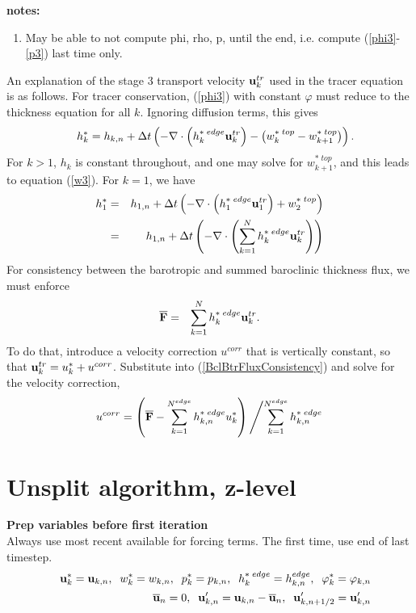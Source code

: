 \documentclass[11pt]{report}
\begin{document}
\newpage
{\bf notes:}
\begin{enumerate}
\item May be able to not compute phi, rho, p, until the end, i.e. compute (\ref{phi3}-\ref{p3}) last time only.
\end{enumerate}

An explanation of the stage 3 transport velocity ${\bf u}_k^{tr}$ used in the tracer equation is as follows.  For tracer conservation, (\ref{phi3}) with constant $\varphi$ must reduce to the thickness equation for all $k$.  Ignoring diffusion terms, this gives
\begin{eqnarray}   &&
\label{phi4}
h_k^* = 
h_{k,n} 
+ \Delta t
\left(  - \nabla \cdot \left( h_k^{*\; edge} {\bf u}_k^{tr} \right)  
- \left( w_k^{*\; top} -  w_{k+1}^{*\; top} \right)  
\right).
\end{eqnarray}
For $k>1$, $h_k$ is constant throughout, and one may solve for $w_{k+1}^{*\; top}$, and this leads to equation (\ref{w3}).  For $k=1$, we have
\begin{eqnarray}  
\label{phi5}
h_1^* &=& 
h_{1,n} 
+ \Delta t
\left(  - \nabla \cdot \left( h_1^{*\; edge} {\bf u}_1^{tr} \right)  
+  w_{2}^{*\; top} 
\right) \\ \label{h6}
&=& h_{1,n} + \Delta t
\left(  - \nabla \cdot \left( \sum_{k=1}^N h_k^{*\; edge} {\bf u}_k^{tr} \right)  
\right)
\end{eqnarray}
For consistency between the barotropic and summed baroclinic thickness flux, we must enforce
\begin{eqnarray}
{\overline {\bf F}} &=& \sum_{k=1}^N h_k^{*\; edge} {\bf u}_k^{tr}.
\label{BclBtrFluxConsistency}
\end{eqnarray}
To do that, introduce a velocity correction $u^{corr}$ that is vertically constant, so that 
${\bf u}_k^{tr}=u^*_k + u^{corr}$.  Substitute into (\ref{BclBtrFluxConsistency}) and solve for the velocity correction,
\begin{eqnarray}
u^{corr} = \left( {\overline {\bf F}} 
  - \sum_{k=1}^{N^{edge}} h_{k,n}^{*\;edge} u_k^* \right)
\left/ \sum_{k=1}^{N^{edge}} h_{k,n}^{*\;edge} \right. 
\end{eqnarray}

\newpage
\section{Unsplit algorithm, z-level}
{\bf Prep variables before first iteration}\\
Always use most recent available for forcing terms.  The first time, use end of last timestep.
\begin{eqnarray} &&
{\bf u}_k^*={\bf u}_{k,n},\;\;
w_k^*=w_{k,n},\;\;
p_k^*=p_{k,n}, \;\;
h_k^{*\; edge}=h_{k,n}^{edge}, \;\;
{\varphi}_k^* = {\varphi}_{k,n} \\&&
\overline{\bf u}_n = 0, \;\;
{\bf u}'_{k,n} = {\bf u}_{k,n} - \overline{\bf u}_n, \;\;
{\bf u}_{k,n+1/2}'={\bf u}_{k,n}' 
\end{eqnarray}
\end{document}
